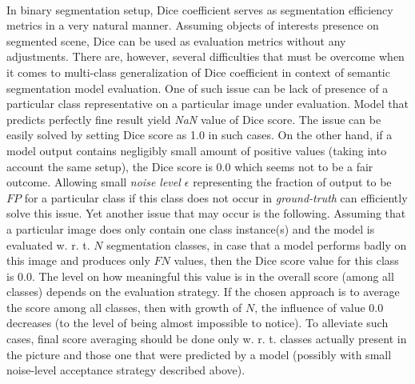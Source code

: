 \documentclass{article}
\begin{document}
\paragraph{}
In binary segmentation setup, Dice coefficient serves as segmentation efficiency metrics in a very natural manner. Assuming objects of interests presence on segmented scene, Dice can be used as evaluation metrics without any adjustments. There are, however, several difficulties that must be overcome when it comes to multi-class generalization of Dice coefficient in context of semantic segmentation model evaluation. One of such issue can be lack of presence of a particular class representative on a particular image under evaluation. Model that predicts perfectly fine result yield \textit{NaN} value of Dice score. The issue can be easily solved by setting Dice score as 1.0 in such cases. On the other hand, if a model output contains negligibly small amount of positive values (taking into account the same setup), the Dice score is 0.0 which seems not to be a fair outcome. Allowing small \textit{noise level $\epsilon$} representing the fraction of output to be \textit{$FP$} for a particular class if this class does not occur in \textit{ground-truth} can efficiently solve this issue. Yet another issue that may occur is the following. Assuming that a particular image does only contain one class instance(s) and the model is evaluated w. r. t. $N$ segmentation classes, in case that a model performs badly on this image and produces only $FN$ values, then the Dice score value for this class is 0.0. The level on how meaningful this value is in the overall score (among all classes) depends on the evaluation strategy. If the chosen approach is to average the score among all classes, then with growth of $N$, the influence of value 0.0 decreases (to the level of being almost impossible to notice). To alleviate such cases, final score averaging should be done only w. r. t. classes actually present in the picture and those one that were predicted by a model (possibly with small noise-level acceptance strategy described above).
\end{document}
